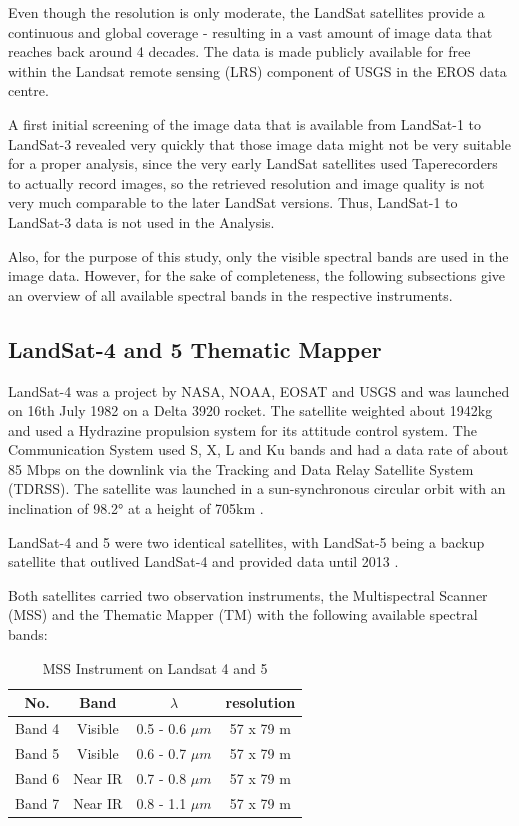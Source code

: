 Even though the resolution is only moderate, the LandSat satellites provide a continuous and global coverage - resulting in a vast amount of image data that reaches back around 4 decades. The data is made publicly available for free within the Landsat remote sensing (LRS) component of USGS in the EROS data centre.\citep{remote:usgs}

A first initial screening of the image data that is available from LandSat-1 to LandSat-3 revealed very quickly that those image data might not be very suitable for a proper analysis, since the very early LandSat satellites used Taperecorders to actually record images, so the retrieved resolution and image quality is not very much comparable to the later LandSat versions. Thus, LandSat-1 to LandSat-3 data is not used in the Analysis.

Also, for the purpose of this study, only the visible spectral bands are used in the image data. However, for the sake of completeness, the following subsections give an overview of all available spectral bands in the respective instruments.

\subsection{LandSat-4 and 5 Thematic Mapper}
LandSat-4 was a project by NASA, NOAA, EOSAT and USGS and was launched on 16th July 1982 on a Delta 3920 rocket. The satellite weighted about 1942kg and used a Hydrazine propulsion system for its attitude control system. The Communication System used S, X, L and  Ku bands and had a data rate of about 85 Mbps on the downlink via the Tracking and Data Relay Satellite System (TDRSS). The satellite was launched in a sun-synchronous circular orbit with an inclination of 98.2° at a height of 705km \citep{l4:usgs}.


LandSat-4 and 5 were two identical satellites, with LandSat-5 being a backup satellite that outlived LandSat-4 and provided data until 2013 \citep{l5:wiki,l5:usgs}.

Both satellites carried two observation instruments, the Multispectral Scanner (MSS) and the Thematic Mapper (TM) with the following available spectral bands:

\begin{table} [h!]
	\centering
	\begin{tabular}{ | c | c | c | c |}
	\hline
	\textbf{No.} & \textbf{Band} & \textbf{$\lambda$} & \textbf{resolution} \\
	\hline
	Band 4 & Visible & 0.5 - 0.6 $\mu m$ & {57 x 79 m} \\
	Band 5 & Visible & 0.6 - 0.7 $\mu m$ & {57 x 79 m} \\
	Band 6 & Near IR & 0.7 - 0.8 $\mu m$ & {57 x 79 m} \\
	Band 7 & Near IR & 0.8 - 1.1 $\mu m$ & {57 x 79 m} \\
	\hline
	\end{tabular}
	\caption{MSS Instrument on Landsat 4 and 5\citep{l4:usgs}\citep{l5:usgs}}
	\label{tab:L45MSS}
\end{table}


